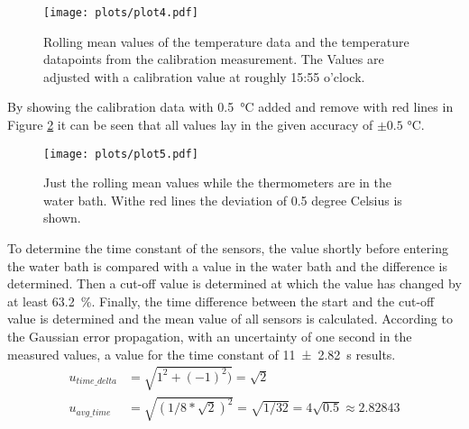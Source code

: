 \begin{figure}
    \centering 
    \texttt{[image: plots/plot4.pdf]}
    \caption{Rolling mean values of the temperature data and the temperature datapoints from the calibration measurement. The Values are adjusted with a calibration value at roughly 15:55 o'clock.}
    \label{fig:plot4}
\end{figure}
By showing the calibration data with \SI{0.5}{\celsius} added and remove with red lines in Figure \ref{fig:plot5} it can be seen that all values lay in the given accuracy of $\pm 0.5$ \si{\celsius}.\\

\begin{figure}
    \centering 
    \texttt{[image: plots/plot5.pdf]}
    \caption{Just the rolling mean values while the thermometers are in the water bath. Withe red lines the deviation of 0.5 degree Celsius is shown.}
    \label{fig:plot5}
\end{figure}
To determine the time constant of the sensors, the value shortly before entering the water bath is compared with a value in the water bath and the difference is determined.
Then a cut-off value is determined at which the value has changed by at least \SI{63.2}{\percent}.
Finally, the time difference between the start and the cut-off value is determined and the mean value of all sensors is calculated.
According to the Gaussian error propagation, with an uncertainty of one second in the measured values, a value for the time constant of \SI{11(2.82)}{\second} results.
\begin{align}
    u_{time\_delta} &= \sqrt{1^2+(-1)^2)} = \sqrt{2}\\
    u_{avg\_time} &= \sqrt{(1/8*\sqrt{2})^2} = \sqrt{1/32} = 4\sqrt{0.5} ≈ 2.82843
\end{align}